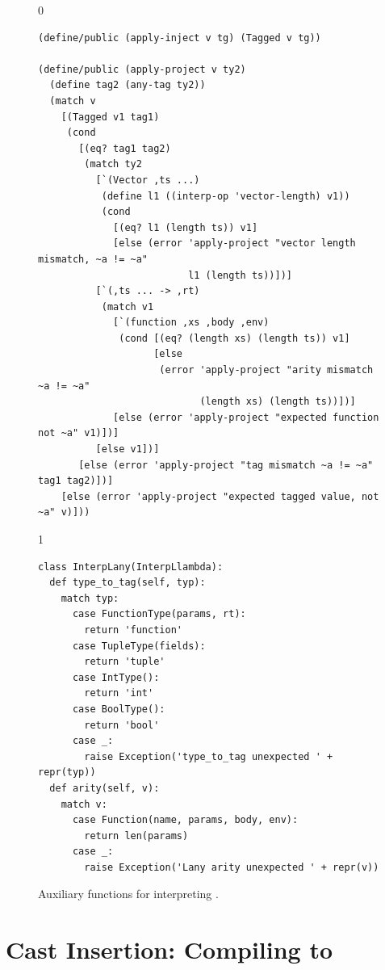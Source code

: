 \documentclass[7x10]{TimesAPriori_MIT}%
\def\racketEd{0}
\def\pythonEd{1}
\providecommand{\BookEdition}{1}
\let\edition\BookEdition
\newcommand{\pythonColor}[0]{}
\numberwithin{theorem}{chapter}
\numberwithin{definition}{chapter}
\numberwithin{equation}{chapter}
\begin{document}
\begin{figure}[btp]
  \begin{tcolorbox}[colback=white]  
{\if\edition\racketEd
\begin{lstlisting}[basicstyle=\ttfamily\footnotesize]
(define/public (apply-inject v tg) (Tagged v tg))

(define/public (apply-project v ty2)
  (define tag2 (any-tag ty2))
  (match v
    [(Tagged v1 tag1)
     (cond
       [(eq? tag1 tag2)
        (match ty2
          [`(Vector ,ts ...)
           (define l1 ((interp-op 'vector-length) v1))
           (cond
             [(eq? l1 (length ts)) v1]
             [else (error 'apply-project "vector length mismatch, ~a != ~a"
                          l1 (length ts))])]
          [`(,ts ... -> ,rt)
           (match v1
             [`(function ,xs ,body ,env)
              (cond [(eq? (length xs) (length ts)) v1]
                    [else
                     (error 'apply-project "arity mismatch ~a != ~a"
                            (length xs) (length ts))])]
             [else (error 'apply-project "expected function not ~a" v1)])]
          [else v1])]
       [else (error 'apply-project "tag mismatch ~a != ~a" tag1 tag2)])]
    [else (error 'apply-project "expected tagged value, not ~a" v)]))
\end{lstlisting}
\fi}
{\if\edition\pythonEd\pythonColor
\begin{lstlisting}[basicstyle=\ttfamily\footnotesize]
class InterpLany(InterpLlambda):
  def type_to_tag(self, typ):
    match typ:
      case FunctionType(params, rt):
        return 'function'
      case TupleType(fields):
        return 'tuple'
      case IntType():
        return 'int'
      case BoolType():
        return 'bool'
      case _:
        raise Exception('type_to_tag unexpected ' + repr(typ))
  def arity(self, v):
    match v:
      case Function(name, params, body, env):
        return len(params)
      case _:
        raise Exception('Lany arity unexpected ' + repr(v))
\end{lstlisting}
\fi}
  \end{tcolorbox}

  \caption{Auxiliary functions for interpreting \LangAny{}.}
  \label{fig:interp-Lany-aux}
\end{figure}

\clearpage

\section{Cast Insertion: Compiling \LangDyn{} to \LangAny{}}
\label{sec:compile-r7}
\end{document}
